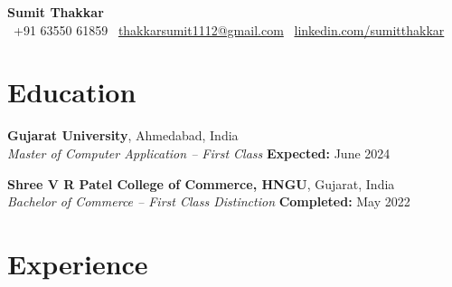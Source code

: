 \documentclass[11pt,a4paper]{article}
\begin{document}
\begin{center}
  {\Huge \textbf{Sumit Thakkar}}\\[8pt]
  \faPhone \ +91 63550 61859 \quad
  \faEnvelope \ \href{mailto:thakkarsumit1112@gmail.com}{thakkarsumit1112@gmail.com} \quad
  \faLinkedinSquare \ \href{https://linkedin.com/sumitthakkar}{linkedin.com/sumitthakkar}
\end{center}

\vspace{0.5cm}

\section*{Education}

\textbf{Gujarat University}, Ahmedabad, India \\
\textit{Master of Computer Application – First Class} \hfill \textbf{Expected:} June 2024

\vspace{0.2cm}

\textbf{Shree V R Patel College of Commerce, HNGU}, Gujarat, India \\
\textit{Bachelor of Commerce – First Class Distinction} \hfill \textbf{Completed:} May 2022

\section*{Experience}
\end{document}
